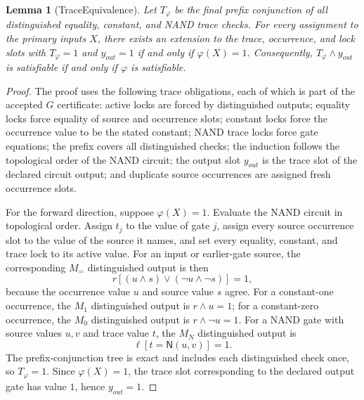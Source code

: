 \documentclass[10.5pt,a4paper]{article}
\newtheorem{lemma}[theorem]{Lemma}
\newcommand{\NAND}{\mathsf{N}}
\begin{document}
\begin{lemma}[TraceEquivalence]
Let \(T_\varphi\) be the final prefix conjunction of all distinguished equality, constant, and NAND trace checks.
For every assignment to the primary inputs \(X\), there exists an extension to the trace, occurrence, and lock
slots with \(T_\varphi=1\) and \(y_{out}=1\) if and only if \(\varphi(X)=1\).  Consequently,
\(T_\varphi\wedge y_{out}\) is satisfiable if and only if \(\varphi\) is satisfiable.
\end{lemma}
\begin{proof}
The proof uses the following trace obligations, each of which is part of the accepted \(G\) certificate: active locks
are forced by distinguished outputs; equality locks force equality of source and occurrence slots; constant locks
force the occurrence value to be the stated constant; NAND trace locks force gate equations; the prefix covers
all distinguished checks; the induction follows the topological order of the NAND circuit; the output slot
\(y_{out}\) is the trace slot of the declared circuit output; and duplicate source occurrences are assigned fresh
occurrence slots.

For the forward direction, suppose \(\varphi(X)=1\).  Evaluate the NAND circuit in topological order.  Assign
\(t_j\) to the value of gate \(j\), assign every source occurrence slot to the value of the source it names, and set
every equality, constant, and trace lock to its active value.  For an input or earlier-gate source, the corresponding
\(M_=\) distinguished output is then
\[
 r[(u\wedge s)\vee(\neg u\wedge\neg s)]=1,
\]
because the occurrence value \(u\) and source value \(s\) agree.  For a constant-one occurrence, the
\(M_1\) distinguished output is \(r\wedge u=1\); for a constant-zero occurrence, the \(M_0\) distinguished
output is \(r\wedge\neg u=1\).  For a NAND gate with source values \(u,v\) and trace value \(t\), the
\(M_N\) distinguished output is
\[
 \ell[t=\NAND(u,v)]=1.
\]
The prefix-conjunction tree is exact and includes each distinguished check once, so \(T_\varphi=1\).  Since
\(\varphi(X)=1\), the trace slot corresponding to the declared output gate has value \(1\), hence \(y_{out}=1\).


\end{proof}
\end{document}
